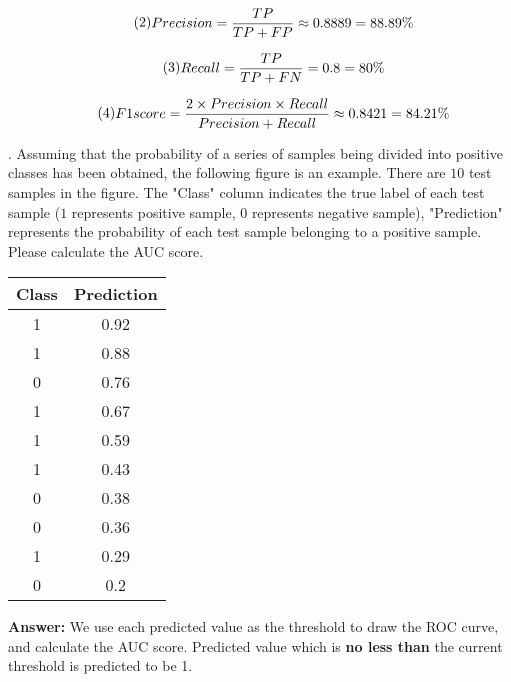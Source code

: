 \documentclass{article}
\begin{document}
\begin{equation}{\tag{2}}
    \begin{aligned}
        Precision = \frac{TP}{TP + FP} \approx 0.8889 = 88.89\%
    \end{aligned}
\end{equation}

\begin{equation}{\tag{3}}
    \begin{aligned}
        Recall = \frac{TP}{TP + FN} = 0.8 = 80\%
    \end{aligned}
\end{equation}

\begin{equation}{\tag{4}}
    \begin{aligned}
        F1score = \frac{2 \times Precision \times Recall}{Precision + Recall} \approx 0.8421 = 84.21\%
    \end{aligned}
\end{equation}

\newpage
{}. Assuming that the probability of a series of samples being divided into positive classes has been obtained, the following figure is an example. There are $10$ test samples in the figure. The "Class" column indicates the true label of each test sample ($1$ represents positive sample, $0$ represents negative sample), "Prediction" represents the probability of each test sample belonging to a positive sample. \\
Please calculate the AUC score. 

\begin{table}[tbh!]
\centering 
\begin{tabularx}{3cm}{cc}   
\hline                       
Class & Prediction  \\  
\hline  
1  & 0.92  \\  
1  & 0.88\\  
0  & 0.76  \\  
1  & 0.67 \\  
1  & 0.59  \\  
1  & 0.43\\  
0  & 0.38  \\  
0  & 0.36\\  
1  & 0.29  \\  
0  & 0.2\\  
\hline  
\end{tabularx}  
\end{table}  

\textbf{Answer:} We use each predicted value as the threshold to draw the ROC curve, and calculate the AUC score. Predicted value which is \textbf{no less than} the current threshold is predicted to be 1. \\
\end{document}
